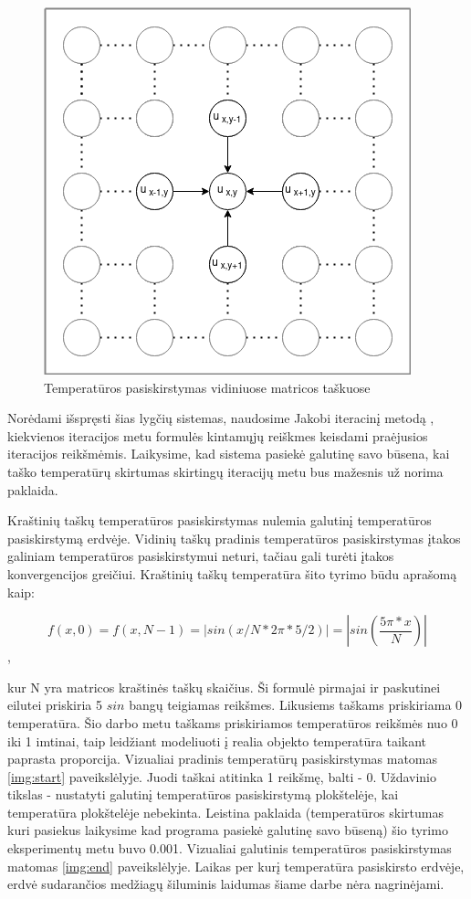 \documentclass{VUMIFPSbakalaurinis}
\begin{document}
\begin{figure}[H]
    \centering
    \includegraphics[scale=0.7]{img/5point.png}
    \caption{Temperatūros pasiskirstymas vidiniuose matricos taškuose}
    \label{img:5point}
\end{figure}

Norėdami išspręsti šias lygčių sistemas, naudosime Jakobi iteracinį metodą \cite{burden2011numerical}, kiekvienos iteracijos metu formulės kintamųjų reiškmes keisdami praėjusios iteracijos reikšmėmis.
Laikysime, kad sistema pasiekė galutinę savo būsena, kai taško temperatūrų skirtumas skirtingų iteracijų metu bus mažesnis už norima paklaida.

Kraštinių taškų temperatūros pasiskirstymas nulemia galutinį temperatūros pasiskirstymą erdvėje.
Vidinių taškų pradinis temperatūros pasiskirstymas įtakos galiniam temperatūros pasiskirstymui neturi, tačiau gali turėti įtakos konvergencijos greičiui.
Kraštinių taškų temperatūra šito tyrimo būdu aprašomą kaip:

\[ f(x, 0) = f(x, N-1) = |sin(x/N * 2\pi * 5/2)| = |sin(\frac{5\pi * x}{N})| \], 

kur N yra matricos kraštinės taškų skaičius.
Ši formulė pirmajai ir paskutinei eilutei priskiria 5 $sin$ bangų teigiamas reikšmes.
Likusiems taškams priskiriama 0 temperatūra.
Šio darbo metu taškams priskiriamos temperatūros reikšmės nuo 0 iki 1 imtinai, taip leidžiant modeliuoti į realia objekto temperatūra taikant paprasta proporcija.
Vizualiai pradinis temperatūrų pasiskirstymas matomas \ref{img:start} paveikslėlyje.
Juodi taškai atitinka 1 reikšmę, balti - 0.
Uždavinio tikslas - nustatyti galutinį temperatūros pasiskirstymą plokštelėje, kai temperatūra plokštelėje nebekinta.
Leistina paklaida (temperatūros skirtumas kuri pasiekus laikysime kad programa pasiekė galutinę savo būseną) šio tyrimo eksperimentų metu buvo 0.001.  
Vizualiai galutinis temperatūros pasiskirstymas matomas \ref{img:end} paveikslėlyje.
Laikas per kurį temperatūra pasiskirsto erdvėje, erdvė sudarančios medžiagų šiluminis laidumas šiame darbe nėra nagrinėjami. 
\end{document}
